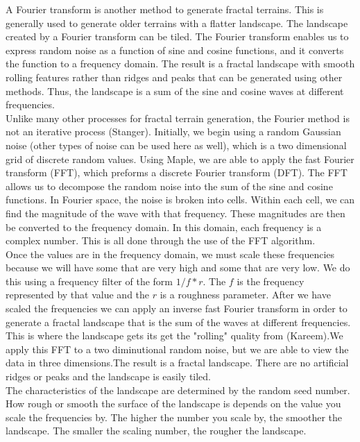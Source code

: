 \documentclass{article}
\begin{document}
	\indent A Fourier transform is another method to generate fractal terrains. This is generally used to generate older terrains with a flatter landscape. The landscape created by a Fourier transform can be tiled. The Fourier transform enables us to express random noise as a function of sine and cosine functions, and it converts the function to a frequency domain. The result is a fractal landscape with smooth rolling features rather than ridges and peaks that can be generated using other methods. Thus, the landscape is a sum of the sine and cosine waves at different frequencies.	\\
	\indent Unlike many other processes for fractal terrain generation, the Fourier method is not an iterative process (Stanger). Initially, we begin using a random Gaussian noise (other types of noise can be used here as well), which is a two dimensional grid of discrete random values. Using Maple, we are able to apply the fast Fourier transform (FFT), which preforms a discrete Fourier transform (DFT). The FFT allows us to decompose the random noise into the sum of the sine and cosine functions. In Fourier space, the noise is broken into cells. Within each cell, we can find the magnitude of the wave with that frequency. These magnitudes are then be converted to the frequency domain. In this domain, each frequency is a complex number. This is all done through the use of the FFT algorithm. \\
	\indent Once the values are in the frequency domain, we must scale these frequencies because we will have some that are very high and some that are very low. We do this using a frequency filter of the form $1/f*r$. The $f$ is the frequency represented by that value and the $r$ is a roughness parameter. After we have scaled the frequencies we can apply an inverse fast Fourier transform in order to generate a fractal landscape that is the sum of the waves at different frequencies. This is where the landscape gets its get the "rolling" quality from (Kareem).We apply this FFT to a two diminutional random noise, but we are able to view the data in three dimensions.The result is a fractal landscape. There are no artificial ridges or peaks and the landscape is easily tiled.\\
	\indent   The characteristics of the landscape are determined by the random seed number. How rough or smooth the surface of the landscape is depends on the value you scale the frequencies by. The higher the number you scale by, the smoother the landscape. The smaller the scaling number, the rougher the landscape.


     

     
    
    

     

    
\end{document}
